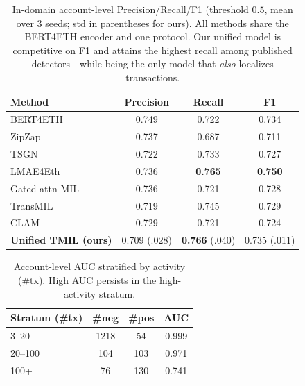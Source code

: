 \documentclass[conference]{IEEEtran}
\newcommand{\best}[1]{\textbf{#1}}
\begin{document}
\begin{table}[t]\centering\caption{In-domain account-level Precision/Recall/F1
(threshold $0.5$, mean over 3 seeds; std in parentheses for ours). All methods share
the BERT4ETH encoder and one protocol. Our unified model is competitive on F1 and
attains the highest recall among published detectors---while being the only model
that \emph{also} localizes transactions.}\label{tab:prf}
\begin{tabular}{lccc}\toprule
\textbf{Method} & \textbf{Precision} & \textbf{Recall} & \textbf{F1} \\\midrule
BERT4ETH~\cite{bert4eth} & 0.749 & 0.722 & 0.734 \\
ZipZap~\cite{zipzap} & 0.737 & 0.687 & 0.711 \\
TSGN~\cite{tsgn} & 0.722 & 0.733 & 0.727 \\
LMAE4Eth~\cite{lmae4eth} & 0.736 & \best{0.765} & \best{0.750} \\
Gated-attn MIL~\cite{ilse2018} & 0.736 & 0.721 & 0.728 \\
TransMIL~\cite{transmil} & 0.719 & 0.745 & 0.729 \\
CLAM~\cite{clam} & 0.729 & 0.721 & 0.724 \\\midrule
\textbf{Unified TMIL (ours)} & 0.709 \footnotesize{(.028)} & \best{0.766} \footnotesize{(.040)} & 0.735 \footnotesize{(.011)} \\
\bottomrule\end{tabular}\end{table}

\begin{table}[t]\centering\caption{Account-level AUC stratified by activity (\#tx).
High AUC persists in the high-activity stratum.}\label{tab:strat}
\begin{tabular}{lccc}\toprule
\textbf{Stratum (\#tx)} & \textbf{\#neg} & \textbf{\#pos} & \textbf{AUC} \\\midrule
3--20 & 1218 & 54 & 0.999 \\
20--100 & 104 & 103 & 0.971 \\
100+ & 76 & 130 & 0.741 \\\bottomrule
\end{tabular}\end{table}
\end{document}
